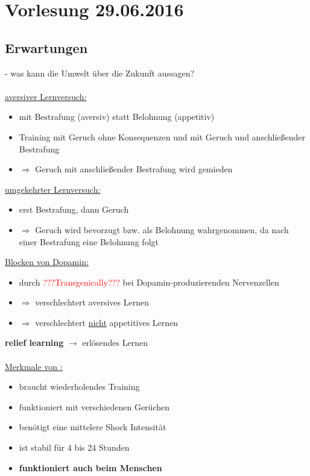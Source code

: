 \section{Vorlesung 29.06.2016}

\subsection{Erwartungen}
 - was kann die Umwelt über die Zukunft aussagen?
\\\\
\underline{aversiver Lernversuch:}
\begin{itemize}
	\item mit Bestrafung (aversiv) statt Belohnung (appetitiv)
	\item Training mit Geruch ohne Konsequenzen und mit Geruch und anschließender Bestrafung
	\item $\Rightarrow$ Geruch mit anschließender Bestrafung wird gemieden
\end{itemize}

\underline{umgekehrter Lernversuch:}
\begin{itemize}
	\item erst Bestrafung, dann Geruch
	\item $\Rightarrow$ Geruch wird bevorzugt bzw. als Belohnung wahrgenommen, da nach einer Bestrafung eine Belohnung folgt
\end{itemize}

\underline{Blocken von Dopamin:}
\begin{itemize}
	\item durch \textcolor{red}{???Transgenically???} bei Dopamin-produzierenden Nervenzellen
	\item $\Rightarrow$ verschlechtert aversives Lernen
	\item $\Rightarrow$ verschlechtert \underline{nicht} appetitives Lernen
\end{itemize}

\textbf{relief learning} $\rightarrow$ erlösendes Lernen
\\\\
\underline{Merkmale von :}
\begin{itemize}
	\item braucht wiederholendes Training
	\item funktioniert mit verschiedenen Gerüchen
	\item benötigt eine mittelere Shock Intensität
	\item ist stabil für 4 bis 24 Stunden
	\item \textbf{funktioniert auch beim Menschen}
\end{itemize}

